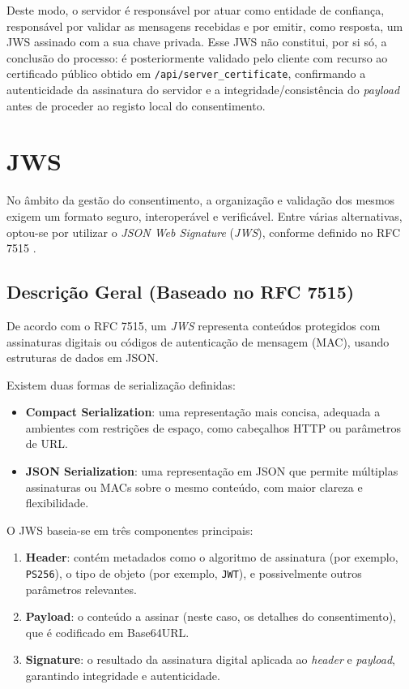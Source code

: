 Deste modo, o servidor é responsável por atuar como entidade de confiança, responsável por validar as mensagens recebidas e por emitir, como resposta, um JWS assinado com a sua chave privada. Esse JWS não constitui, por si só, a conclusão do processo: é posteriormente validado pelo cliente com recurso ao certificado público obtido em \texttt{/api/server\_certificate}, confirmando a autenticidade da assinatura do servidor e a integridade/consistência do \textit{payload} antes de proceder ao registo local do consentimento.

\section{JWS}

No âmbito da gestão do consentimento, a organização e validação dos mesmos exigem um formato seguro, interoperável e verificável. Entre várias alternativas, optou-se por utilizar o \textit{JSON Web Signature} (\textit{JWS}), conforme definido no RFC 7515 \citep{rfc7515}.

\subsection{Descrição Geral (Baseado no RFC 7515)}

De acordo com o RFC 7515, um \textit{JWS} representa conteúdos protegidos com assinaturas digitais ou códigos de autenticação de mensagem (MAC), usando estruturas de dados em JSON.

Existem duas formas de serialização definidas:

\begin{itemize}
  \item \textbf{Compact Serialization}: uma representação mais concisa, adequada a ambientes com restrições de espaço, como cabeçalhos HTTP ou parâmetros de URL.
  \item \textbf{JSON Serialization}: uma representação em JSON que permite múltiplas assinaturas ou MACs sobre o mesmo conteúdo, com maior clareza e flexibilidade.
\end{itemize}

O JWS baseia-se em três componentes principais:

\begin{enumerate}
  \item \textbf{Header}: contém metadados como o algoritmo de assinatura (por exemplo, \texttt{PS256}), o tipo de objeto (por exemplo, \texttt{JWT}), e possivelmente outros parâmetros relevantes.
  \item \textbf{Payload}: o conteúdo a assinar (neste caso, os detalhes do consentimento), que é codificado em Base64URL.
  \item \textbf{Signature}: o resultado da assinatura digital aplicada ao \textit{header} e \textit{payload}, garantindo integridade e autenticidade.
\end{enumerate}

